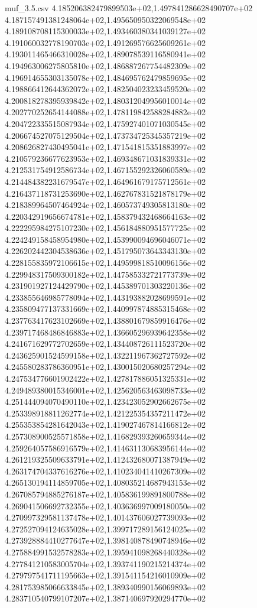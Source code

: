 \begin{filecontents*}{muf_3.5.csv}
4.185206382479899503e+02,1.497841286628490707e+02
4.187157491381248064e+02,1.495650950322069548e+02
4.189108708115300033e+02,1.493460380341039127e+02
4.191060032778190703e+02,1.491269576625609261e+02
4.193011465466310028e+02,1.489078539116580941e+02
4.194963006275805810e+02,1.486887267754482309e+02
4.196914655303135078e+02,1.484695762479859695e+02
4.198866412644362072e+02,1.482504023233459520e+02
4.200818278395939842e+02,1.480312049956010014e+02
4.202770252654144088e+02,1.478119842588284882e+02
4.204722335515087934e+02,1.475927401071030545e+02
4.206674527075129504e+02,1.473734725345357219e+02
4.208626827430495041e+02,1.471541815351883997e+02
4.210579236677623953e+02,1.469348671031839331e+02
4.212531754912586734e+02,1.467155292326060589e+02
4.214484382231679547e+02,1.464961679175712561e+02
4.216437118731253690e+02,1.462767831521878179e+02
4.218389964507464924e+02,1.460573749305813180e+02
4.220342919656674781e+02,1.458379432468664163e+02
4.222295984275107230e+02,1.456184880951577725e+02
4.224249158458954980e+02,1.453990094696046071e+02
4.226202442304538636e+02,1.451795073643343130e+02
4.228155835972106615e+02,1.449599818510096156e+02
4.229948317509300182e+02,1.447585332721773739e+02
4.231901927124429790e+02,1.445389701303220136e+02
4.233855646985778094e+02,1.443193882028699591e+02
4.235809477137331669e+02,1.440997874885315468e+02
4.237763417623102669e+02,1.438801679859916476e+02
4.239717468486846883e+02,1.436605296939642358e+02
4.241671629772702659e+02,1.434408726111523720e+02
4.243625901524599158e+02,1.432211967362727592e+02
4.245580283786360951e+02,1.430015020680257294e+02
4.247534776601902422e+02,1.427817886051325331e+02
4.249489380015346001e+02,1.425620563463098733e+02
4.251444094070490110e+02,1.423423052902662675e+02
4.253398918811262774e+02,1.421225354357211472e+02
4.255353854281642043e+02,1.419027467814166812e+02
4.257308900525571858e+02,1.416829393260659344e+02
4.259264057586916579e+02,1.414631130683956144e+02
4.261219325509633791e+02,1.412432680071387949e+02
4.263174704337616276e+02,1.410234041410267309e+02
4.265130194114859705e+02,1.408035214687943153e+02
4.267085794885276187e+02,1.405836199891800788e+02
4.269041506692732355e+02,1.403636997009180050e+02
4.270997329581137478e+02,1.401437606027739093e+02
4.272527094124635028e+02,1.399717289156124025e+02
4.273928884410277647e+02,1.398140878490748946e+02
4.275884991532578283e+02,1.395941098268440328e+02
4.277841210583005704e+02,1.393741190215214374e+02
4.279797541711195663e+02,1.391541154216010909e+02
4.281753985066633845e+02,1.389340990156069893e+02
4.283710540799107207e+02,1.387140697920294770e+02

\end{filecontents*}
